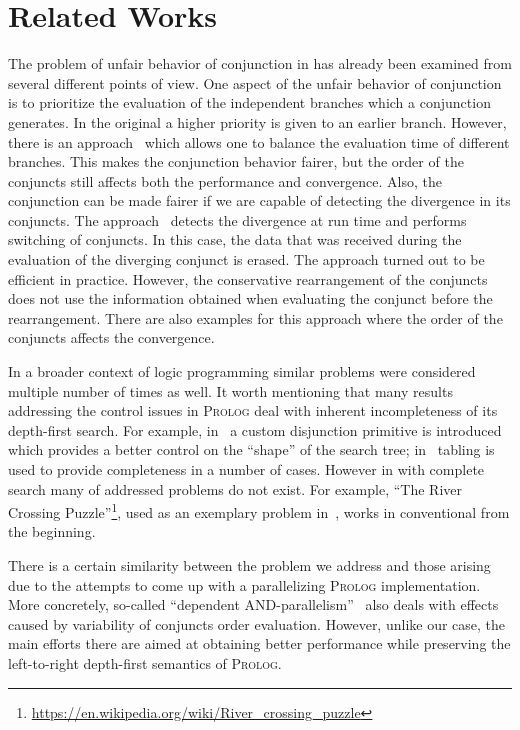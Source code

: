 \section{Related Works}
\label{sec:related}

The problem of unfair behavior of conjunction in \mk has already been examined from several different points of view. One aspect of the unfair behavior of conjunction is to prioritize the
evaluation of the independent branches which a conjunction generates. In the original \mk a higher priority is given to an earlier branch. However, there is an approach~\cite{fair:towardsAM}
which allows one to balance the evaluation time of different branches. This makes the conjunction behavior fairer, but the order of the conjuncts still affects both the performance and convergence.
Also, the conjunction can be made fairer if we are capable of detecting the divergence in its conjuncts. The approach~\cite{fair:DivTest} detects the divergence at run time and
performs switching of conjuncts. In this case, the data that was received during the evaluation of the diverging conjunct is erased. The approach turned out to be efficient in practice.
However, the conservative rearrangement of the conjuncts does not use the information obtained when evaluating the conjunct before the rearrangement. There are also examples for
this approach where the order of the conjuncts affects the convergence.

In a broader context of logic programming similar problems were considered multiple number of times as well. It worth mentioning that many results addressing the control
issues in \textsc{Prolog} deal with inherent incompleteness of its depth-first search. For example, in~\cite{Schrijvers2012TorES} a custom disjunction primitive is
introduced which provides a better control on the ``shape'' of the search tree; in~\cite{OLDresolution} tabling is used to provide completeness in a number of cases.
However in \mk with complete search many of addressed problems do not exist. For example, ``The River Crossing Puzzle''\footnote{\url{https://en.wikipedia.org/wiki/River_crossing_puzzle}},
used as an exemplary problem in~\cite{Schrijvers2012TorES}, works in conventional \mk from the beginning.

There is a certain similarity between the problem we address and those arising due to the attempts to come up with a parallelizing \textsc{Prolog} implementation. More concretely, so-called
``dependent AND-parallelism''~\cite{Parallel} also deals with effects caused by variability of conjuncts order evaluation. However, unlike our case, the main efforts there are
aimed at obtaining better performance while preserving the left-to-right depth-first semantics of \textsc{Prolog}. 

